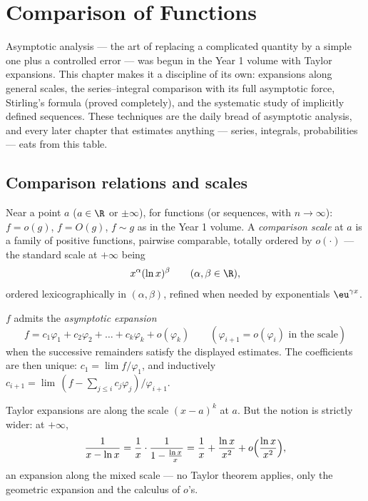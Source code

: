 \chapter{Comparison of Functions}\label{ch:b2:comparison}

Asymptotic analysis --- the art of replacing a complicated quantity
by a simple one plus a controlled error --- was begun in the Year 1
volume with Taylor expansions. This chapter makes it a discipline of
its own: expansions along general scales, the series--integral
comparison with its full asymptotic force, Stirling's formula (proved
completely), and the systematic study of implicitly defined
sequences. These techniques are the daily bread of asymptotic
analysis, and every later chapter that estimates anything ---
series, integrals, probabilities --- eats from this table.

\section{Comparison relations and scales}

\begin{definition}\label{def:b2:comparison:landau}
Near a point $a$ ($a \in \R$ or $\pm\infty$), for functions (or
sequences, with $n \to \infty$): $f = o(g)$, $f = O(g)$, $f \sim g$
as in the Year 1 volume. A \emph{comparison
scale} at $a$ is a family of positive
functions, pairwise comparable, totally ordered by $o(\cdot)$ ---
the standard scale at $+\infty$ being
\[
x^{\alpha} (\ln x)^{\beta}
\qquad (\alpha, \beta \in \R),
\]
ordered lexicographically in $(\alpha, \beta)$, refined when needed
by exponentials $\eu^{\gamma x}$.
\end{definition}

\begin{definition}\label{def:b2:comparison:expansion}
$f$ admits the \emph{asymptotic expansion}
\[
f = c_1 \varphi_1 + c_2\varphi_2 + \dots + c_k \varphi_k +
o(\varphi_k)
\qquad (\varphi_{i+1} = o(\varphi_i) \text{ in the scale})
\]
when the successive remainders satisfy the displayed estimates. The
coefficients are then unique: $c_1 = \lim f/\varphi_1$, and
inductively $c_{i+1} = \lim\,(f - \sum_{j \leq i}
c_j\varphi_j)/\varphi_{i+1}$.
\end{definition}

\begin{example}
Taylor expansions are  along the scale $(x -
a)^k$ at $a$. But the notion is strictly wider: at $+\infty$,
\[
\frac{1}{x - \ln x}
= \frac1x \cdot \frac{1}{1 - \frac{\ln x}{x}}
= \frac1x + \frac{\ln x}{x^2} + o\Bigl(\frac{\ln x}{x^2}\Bigr),
\]
an expansion along the mixed scale --- no Taylor theorem applies,
only the geometric expansion and the calculus of $o$'s.
\end{example}

